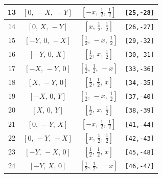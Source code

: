 \documentclass[fleqn,8pt]{jsarticle}
\begin{document}
\begin{longtable}{cccc}
13 & $\left[ 0,\, - X,\, - Y \right]$ & $\left[ - x,\, \frac{1}{2},\, \frac{1}{2} \right]$ & {\tt [25,-28]} \\ \hline
14 & $\left[ 0,\, X,\, - Y \right]$ & $\left[ x,\, \frac{1}{2},\, \frac{1}{2} \right]$ & {\tt [26,-27]} \\ \hline
15 & $\left[ - Y,\, 0,\, - X \right]$ & $\left[ \frac{1}{2},\, - x,\, \frac{1}{2} \right]$ & {\tt [29,-32]} \\ \hline
16 & $\left[ - Y,\, 0,\, X \right]$ & $\left[ \frac{1}{2},\, x,\, \frac{1}{2} \right]$ & {\tt [30,-31]} \\ \hline
17 & $\left[ - X,\, - Y,\, 0 \right]$ & $\left[ \frac{1}{2},\, \frac{1}{2},\, - x \right]$ & {\tt [33,-36]} \\ \hline
18 & $\left[ X,\, - Y,\, 0 \right]$ & $\left[ \frac{1}{2},\, \frac{1}{2},\, x \right]$ & {\tt [34,-35]} \\ \hline
19 & $\left[ - X,\, 0,\, Y \right]$ & $\left[ \frac{1}{2},\, - x,\, \frac{1}{2} \right]$ & {\tt [37,-40]} \\ \hline
20 & $\left[ X,\, 0,\, Y \right]$ & $\left[ \frac{1}{2},\, x,\, \frac{1}{2} \right]$ & {\tt [38,-39]} \\ \hline
21 & $\left[ 0,\, - Y,\, X \right]$ & $\left[ - x,\, \frac{1}{2},\, \frac{1}{2} \right]$ & {\tt [41,-44]} \\ \hline
22 & $\left[ 0,\, - Y,\, - X \right]$ & $\left[ x,\, \frac{1}{2},\, \frac{1}{2} \right]$ & {\tt [42,-43]} \\ \hline
23 & $\left[ - Y,\, - X,\, 0 \right]$ & $\left[ \frac{1}{2},\, \frac{1}{2},\, x \right]$ & {\tt [45,-48]} \\ \hline
24 & $\left[ - Y,\, X,\, 0 \right]$ & $\left[ \frac{1}{2},\, \frac{1}{2},\, - x \right]$ & {\tt [46,-47]} \\
\end{longtable}
\renewcommand{\arraystretch}{1.2}
\end{document}
